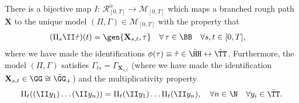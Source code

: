 \documentclass{article}
\begin{document}
\begin{proposition} \label{prop:rosa}
There is a bijective map $I:\,\mathscr{R}^\alpha_{[0,T]}\rightarrow\mathscr{M}_{[0,T]}$ which maps a branched rough path $\mathbf{X}$ to the unique model $(\Pi,\Gamma)\in\mathscr{M}_{[0,T]}$ with the property that
\begin{align*}
(\Pi_s \II\dot \tau)(t) &= \gen{\mathbf{X}_{s,t},\tau}\quad \forall\,\tau\in\BB \quad \forall s,t \in [0,T],
\end{align*}
where we have made the identifications $\phi (\tau) \equiv \dot \tau \in \tilde \HH \leftrightarrow \tilde \TT$. Furthermore, the model $(\Pi,\Gamma)$ satisfies $\Gamma_{ts} = \Gamma_{\mathbf{X}_{s,t}}$ (where we have made the identification $\mathbf{X}_{s,t} \in \GG \cong \tilde \GG_+$) and the multiplicativity property
\begin{equation}\label{eq:modelMult}
\Pi_t ((\II y_1) \ldots (\II y_n)) = \Pi_t (\II y_1) \ldots \Pi_t (\II y_n), \quad \forall n \in \N \quad \forall y_i \in \tilde \TT.
\end{equation}
\end{proposition}

\end{document}
